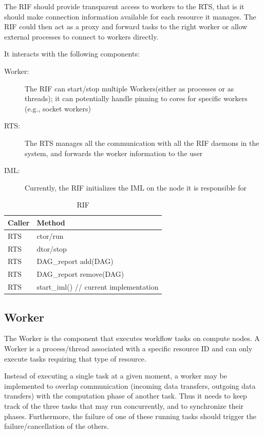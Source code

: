 \documentclass[10pt]{article}
\newcommand{\rts}{RTS\xspace}
\newcommand{\worker}{Worker\xspace}
\newcommand{\workers}{Workers\xspace}
\newcommand{\iml}{IML\xspace}
\newcommand{\rif}{RIF\xspace}
\newcommand{\rdag}{DAG\xspace}
\newcommand{\rdagrep}{DAG\_report\xspace}
\begin{document}
The \rif should provide transparent access to workers to the \rts, that is it
should make connection information available for each resource it manages. The
\rif could then act as a proxy and forward tasks to the right worker or allow
external processes to connect to workers directly.

It interacts with the following components:
\begin{description}
    \item [\worker:] The \rif can start/stop multiple \workers (either as
    processes or as threads); it can potentially handle pinning to cores for
    specific workers (e.g., socket workers)
    \item [\rts:] The \rts manages all the communication with all the \rif
    daemons in the system, and forwards the worker information to the user
    \item [\iml:] Currently, the \rif initializes the \iml on the node it is 
    responsible for
\end{description}
%
\begin{table}[ht]
    \centering
    \caption{RIF}
    \label{tab:rif}
    \bgroup
    \setlength{\tabcolsep}{2em}
    \begin{tabular}{ll}
        \toprule
        Caller & Method \\
        \midrule
        \rts & ctor/run \\
        \rts & dtor/stop \\
        \rts & \rdagrep add(\rdag)  \\
        \rts & \rdagrep remove(\rdag) \\
        \midrule
        \rts & start\_iml() // current implementation \\
        \bottomrule
    \end{tabular}
    \egroup
\end{table}
%

\subsection{Worker}
The \worker is the component that executes workflow tasks on compute nodes. A
\worker is a process/thread associated with a specific resource ID and can only
execute tasks requiring that type of resource.

Instead of executing a single task at a given moment, a worker may be
implemented to overlap communication (incoming data transfers, outgoing data
transfers) with the computation phase of another task.
Thus it needs to keep track of the three tasks that may run concurrently, and to
synchronize their phases.
Furthermore, the failure of one of these running tasks should  trigger the
failure/cancellation of the others.
\end{document}
